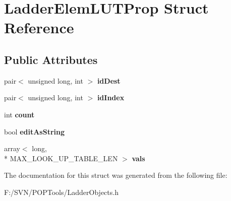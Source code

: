 \hypertarget{struct_ladder_elem_l_u_t_prop}{\section{Ladder\-Elem\-L\-U\-T\-Prop Struct Reference}
\label{struct_ladder_elem_l_u_t_prop}
}
\subsection*{Public Attributes}
\begin{DoxyCompactItemize}
\item 
\hypertarget{struct_ladder_elem_l_u_t_prop_a42058a10e7f3bcb956625e7ac8db3dd0}{pair$<$ unsigned long, int $>$ {\bfseries id\-Dest}}\label{struct_ladder_elem_l_u_t_prop_a42058a10e7f3bcb956625e7ac8db3dd0}

\item 
\hypertarget{struct_ladder_elem_l_u_t_prop_acb243816bc598c60904dfaffd42f3091}{pair$<$ unsigned long, int $>$ {\bfseries id\-Index}}\label{struct_ladder_elem_l_u_t_prop_acb243816bc598c60904dfaffd42f3091}

\item 
\hypertarget{struct_ladder_elem_l_u_t_prop_a693d57b799493682987890fc09ae561c}{int {\bfseries count}}\label{struct_ladder_elem_l_u_t_prop_a693d57b799493682987890fc09ae561c}

\item 
\hypertarget{struct_ladder_elem_l_u_t_prop_aba37f92334c49012369c0c0c2193a954}{bool {\bfseries edit\-As\-String}}\label{struct_ladder_elem_l_u_t_prop_aba37f92334c49012369c0c0c2193a954}

\item 
\hypertarget{struct_ladder_elem_l_u_t_prop_ae77940f16a3f6c54a781e7db8950a19b}{array$<$ long, \\*
M\-A\-X\-\_\-\-L\-O\-O\-K\-\_\-\-U\-P\-\_\-\-T\-A\-B\-L\-E\-\_\-\-L\-E\-N $>$ {\bfseries vals}}\label{struct_ladder_elem_l_u_t_prop_ae77940f16a3f6c54a781e7db8950a19b}

\end{DoxyCompactItemize}


The documentation for this struct was generated from the following file\-:\begin{DoxyCompactItemize}
\item 
F\-:/\-S\-V\-N/\-P\-O\-P\-Tools/Ladder\-Objects.\-h\end{DoxyCompactItemize}
